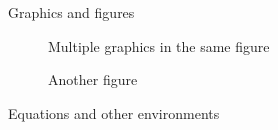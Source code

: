 \documentclass{beamer}
\newlength{\twocolwid}
\begin{document}
\begin{frame}[t, fragile]
\begin{columns}[t]
\begin{column}{\twocolwid}
\begin{alertblock}{Graphics and figures}
\begin{minipage}{.48\textwidth}
\begin{figure}[htp]
	\quad
	
	\caption{Multiple graphics in the same figure}
	\label{fig:multiple}
	\end{figure}
	
	\end{minipage}
	\begin{minipage}{.48\textwidth}
		
	\begin{figure}
	
	\caption{Another figure}
	\label{fig:3}
	
	\end{figure}
	\end{minipage}
	
\end{alertblock} 

\begin{block}{Equations and other environments}

\begin{columns}[t,totalwidth=\twocolwid]
	

\end{columns}
\end{block}
\end{column}
\end{columns}
\end{frame}
\end{document}
